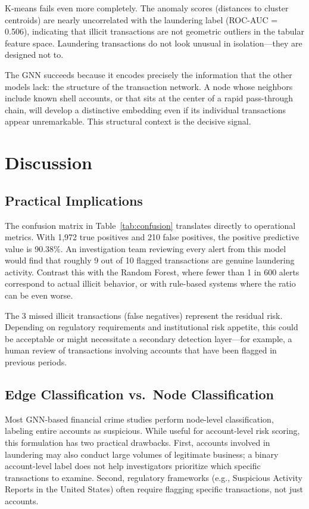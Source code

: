 \documentclass[conference]{IEEEtran}
\begin{document}
K-means fails even more completely. The anomaly scores (distances to cluster centroids) are nearly uncorrelated with the laundering label (ROC-AUC = 0.506), indicating that illicit transactions are not geometric outliers in the tabular feature space. Laundering transactions do not look unusual in isolation---they are designed not to.

The GNN succeeds because it encodes precisely the information that the other models lack: the structure of the transaction network. A node whose neighbors include known shell accounts, or that sits at the center of a rapid pass-through chain, will develop a distinctive embedding even if its individual transactions appear unremarkable. This structural context is the decisive signal.


\section{Discussion}\label{sec:discussion}

\subsection{Practical Implications}

The confusion matrix in Table~\ref{tab:confusion} translates directly to operational metrics. With 1{,}972 true positives and 210 false positives, the positive predictive value is 90.38\%. An investigation team reviewing every alert from this model would find that roughly 9 out of 10 flagged transactions are genuine laundering activity. Contrast this with the Random Forest, where fewer than 1 in 600 alerts correspond to actual illicit behavior, or with rule-based systems where the ratio can be even worse.

The 3 missed illicit transactions (false negatives) represent the residual risk. Depending on regulatory requirements and institutional risk appetite, this could be acceptable or might necessitate a secondary detection layer---for example, a human review of transactions involving accounts that have been flagged in previous periods.

\subsection{Edge Classification vs.\ Node Classification}

Most GNN-based financial crime studies perform node-level classification, labeling entire accounts as suspicious. While useful for account-level risk scoring, this formulation has two practical drawbacks. First, accounts involved in laundering may also conduct large volumes of legitimate business; a binary account-level label does not help investigators prioritize which specific transactions to examine. Second, regulatory frameworks (e.g., Suspicious Activity Reports in the United States) often require flagging specific transactions, not just accounts.
\end{document}
